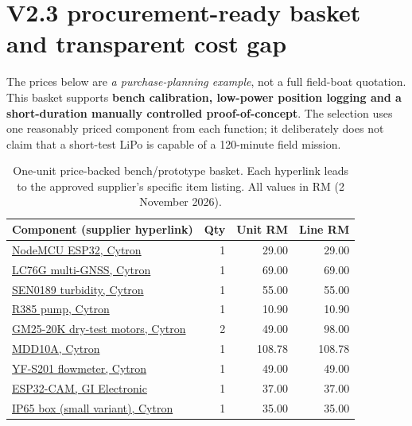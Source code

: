 \documentclass[10pt,a4paper]{article}
\begin{document}
\section{V2.3 procurement-ready basket and transparent cost gap}
The prices below are \emph{a purchase-planning example}, not a full field-boat quotation. This basket supports \textbf{bench calibration, low-power position logging and a short-duration manually controlled proof-of-concept}. The selection uses one reasonably priced component from each function; it deliberately does not claim that a short-test LiPo is capable of a 120-minute field mission.

\begin{table}[H]\centering\footnotesize
\caption{One-unit price-backed bench/prototype basket. Each hyperlink leads to the approved supplier's specific item listing. All values in RM (2 November 2026).}
\begin{tabularx}{\linewidth}{@{}Y r r r@{}}\toprule
Component (supplier hyperlink) & Qty & Unit RM & Line RM \\\midrule
\href{https://my.cytron.io/c-wireless-devices/c-wifi/p-nodemcu-esp32-with-expansion-board}{NodeMCU ESP32, Cytron} & 1 & 29.00 & 29.00\\
\href{https://my.cytron.io/c-other-wireless/p-lc76g-multi-gnss-module-supports-gps-bds-glonass-galileo-qzss}{LC76G multi-GNSS, Cytron} & 1 & 69.00 & 69.00\\
\href{https://my.cytron.io/c-sensor/c-others-sensor/p-gravity-analog-turbidity-sensor-for-arduino-41626}{SEN0189 turbidity, Cytron} & 1 & 55.00 & 55.00\\
\href{https://my.cytron.io/p-r385-dc12v-diaphragm-water-pump}{R385 pump, Cytron} & 1 & 10.90 & 10.90\\
\href{https://my.cytron.io/c-dc-geared-motor/p-12v-980rpm-2.3kgfcm-high-power-brushed-dc-geared-motor}{GM25-20K dry-test motors, Cytron} & 2 & 49.00 & 98.00\\
\href{https://my.cytron.io/c-motor-driver/c-dc-motor-driver/p-10amp-5v-30v-dc-motor-driver-2-channels}{MDD10A, Cytron} & 1 & 108.78 & 108.78\\
\href{https://my.cytron.io/p-g1-2-half-effect-water-flow-sensor-yf-s201}{YF-S201 flowmeter, Cytron} & 1 & 49.00 & 49.00\\
\href{https://www.gie.com.my/shop.php?action=wireless/wifi/esp32_cam}{ESP32-CAM, GI Electronic} & 1 & 37.00 & 37.00\\
\href{https://my.cytron.io/p-outdoor-ip65-water-proof-enclosure-with-abs-plate}{IP65 box (small variant), Cytron} & 1 & 35.00 & 35.00\\

\end{tabularx}
\end{table}
\end{document}
